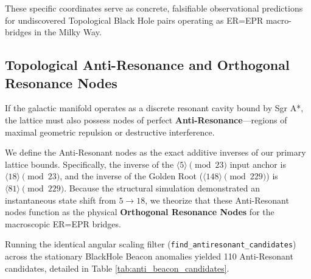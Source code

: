 These specific coordinates serve as concrete, falsifiable observational predictions for undiscovered Topological Black Hole pairs operating as ER=EPR macro-bridges in the Milky Way.

\subsection{Topological Anti-Resonance and Orthogonal Resonance Nodes}

If the galactic manifold operates as a discrete resonant cavity bound by Sgr A*, the lattice must also possess nodes of perfect \textbf{Anti-Resonance}---regions of maximal geometric repulsion or destructive interference. 

We define the Anti-Resonant nodes as the exact additive inverses of our primary lattice bounds. Specifically, the inverse of the $\langle 5 \rangle \pmod{23}$ input anchor is $\langle 18 \rangle \pmod{23}$, and the inverse of the Golden Root ($\langle 148 \rangle \pmod{229}$) is $\langle 81 \rangle \pmod{229}$. Because the structural simulation demonstrated an instantaneous state shift from $5 \to 18$, we theorize that these Anti-Resonant nodes function as the physical \textbf{Orthogonal Resonance Nodes} for the macroscopic ER=EPR bridges.

Running the identical angular scaling filter (\texttt{find\_antiresonant\_candidates}) across the stationary BlackHole Beacon anomalies yielded 110 Anti-Resonant candidates, detailed in Table \ref{tab:anti_beacon_candidates}. 

\begin{table}[ht]
\centering
\renewcommand{\arraystretch}{1.2}
\caption{Top Anti-Resonant anomalies filtered via Metareal geometric inverses. These $PM=0.0$ candidates lock precisely into the $18 \pmod{23}$ invariant loop. \textbf{J1828-0611} acts as the flawless anti-root, theoretically serving as the Orthogonal Resonance Node for macroscopic topological entanglement.}
\label{tab:anti_beacon_candidates}
\end{table}

